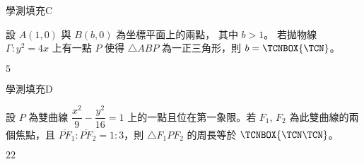     \begin{QUESTION}
        \begin{ExamInfo}{92}{學測}{填充}{C}
        \end{ExamInfo}
        \begin{ExamAnsRateInfo}{27}{52}{21}{8}
        \end{ExamAnsRateInfo}
        \begin{QBODY}
            設 $A(1,0)$ 與 $B(b,0)$ 為坐標平面上的兩點， 其中 $b>1$。 
            若拋物線 $\Gamma : y^2=4x$ 上有一點 $P$ 使得 $\triangle ABP$ 為一正三角形，則 $b= 
            \TCNBOX{\TCN}$。
        \end{QBODY}
        \begin{QFROMS}
        \end{QFROMS}
        \begin{QTAGS}\end{QTAGS}
        \begin{QANS}
            $5$
        \end{QANS}
        \begin{QSOLLIST}
        \end{QSOLLIST}
        \begin{QEMPTYSPACE}
        \end{QEMPTYSPACE}
    \end{QUESTION}
    \begin{QUESTION}
        \begin{ExamInfo}{92}{學測}{填充}{D}
        \end{ExamInfo}
        \begin{ExamAnsRateInfo}{16}{39}{7}{2}
        \end{ExamAnsRateInfo}
        \begin{QBODY}
            設 $P$ 為雙曲線 $\dfrac{x^2}{9} - \dfrac{y^2}{16} = 1$ 上的一點且位在第一象限。若 $F_1$,  $F_2$ 為此雙曲線的兩個焦點，且 $\overline{PF}_1 : \overline{PF}_2 = 1:3 $，則 $\triangle F_1PF_2$ 的周長等於 $
            \TCNBOX{\TCN\TCN}$。
        \end{QBODY}
        \begin{QFROMS}
        \end{QFROMS}
        \begin{QTAGS}\end{QTAGS}
        \begin{QANS}
            $22$
        \end{QANS}
        \begin{QSOLLIST}
        \end{QSOLLIST}
        \begin{QEMPTYSPACE}
        \end{QEMPTYSPACE}
    \end{QUESTION}
